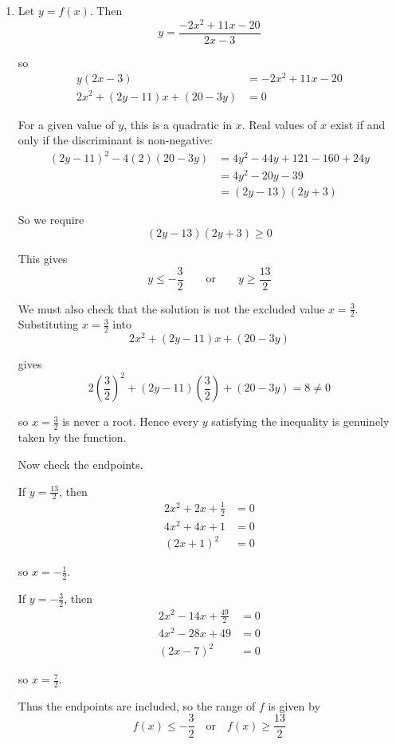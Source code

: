\documentclass[leqno]{article}
\begin{document}
\begin{enumerate}[
  label=\textbf{\arabic*.},
  leftmargin=*,
  topsep=0pt,
  partopsep=0pt,
  parsep=0pt
]
\vspace*{10pt}

\begin{djsSolution}
\begin{enumerate}[label=\textbf{(\alph*)}]
  \item Let \(y=f(x)\). Then
\[
y=\frac{-2x^2+11x-20}{2x-3}
\]

so
\begin{align*}
y(2x-3)&=-2x^2+11x-20\\
2x^2+(2y-11)x+(20-3y)&=0
\end{align*}

For a given value of \(y\), this is a quadratic in \(x\). Real values of \(x\) exist if and only if the discriminant is non-negative:
\begin{align*}
(2y-11)^2-4(2)(20-3y)&=4y^2-44y+121-160+24y\\
&=4y^2-20y-39\\
&=(2y-13)(2y+3)
\end{align*}

So we require
\[
(2y-13)(2y+3)\ge 0
\]

This gives
\[
y\le -\frac32 \qquad \text{or} \qquad y\ge \frac{13}{2}
\]

We must also check that the solution is not the excluded value \(x=\frac32\). Substituting \(x=\frac32\) into
\[
2x^2+(2y-11)x+(20-3y)
\]

gives
\[
2\left(\frac32\right)^2+(2y-11)\left(\frac32\right)+(20-3y)=8\ne 0
\]

so \(x=\frac32\) is never a root. Hence every \(y\) satisfying the inequality is genuinely taken by the function.

Now check the endpoints.

If \(y=\frac{13}{2}\), then
\begin{align*}
2x^2+2x+\frac12&=0\\
4x^2+4x+1&=0\\
(2x+1)^2&=0
\end{align*}

so \(x=-\frac12\).

If \(y=-\frac32\), then
\begin{align*}
2x^2-14x+\frac{49}{2}&=0\\
4x^2-28x+49&=0\\
(2x-7)^2&=0
\end{align*}

so \(x=\frac72\).

Thus the endpoints are included, so the range of \(f\) is given by
\[
f(x)\le -\frac32 \quad \text{or} \quad f(x)\ge \frac{13}{2}
\]


\end{enumerate}
\end{djsSolution}
\end{enumerate}
\end{document}
